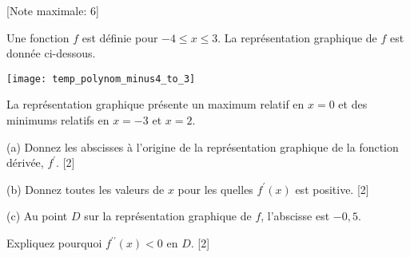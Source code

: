 \bigskip
\begin{question}
  \hspace*{\fill} [Note maximale: 6]\par
  \noindent Une fonction $f$ est définie pour $-4 \le x \le 3$. La représentation graphique de $f$ est donnée ci-dessous.\par
  \medskip
  \begin{center}
    \texttt{[image: temp\_polynom\_minus4\_to\_3]}\par
  \end{center}
  \noindent La représentation graphique présente un maximum relatif en $x = 0$ et des minimums relatifs en $x = -3$ et $x = 2$.\par
  \medskip
  (a) Donnez les abscisses à l’origine de la représentation graphique de la fonction dérivée, $f^\prime$.\hspace*{\fill} [2]\par
  \medskip
  (b) Donnez toutes les valeurs de $x$ pour les quelles $f^\prime(x)$ est positive.\hspace*{\fill} [2]\par
  \medskip
  (c) Au point $D$ sur la représentation graphique de $f$, l’abscisse est $-0,5$.\par
  \hspace{2em} Expliquez pourquoi $f^{\prime\prime}(x) < 0$ en $D$.\hspace*{\fill} [2]\par
\end{question}
